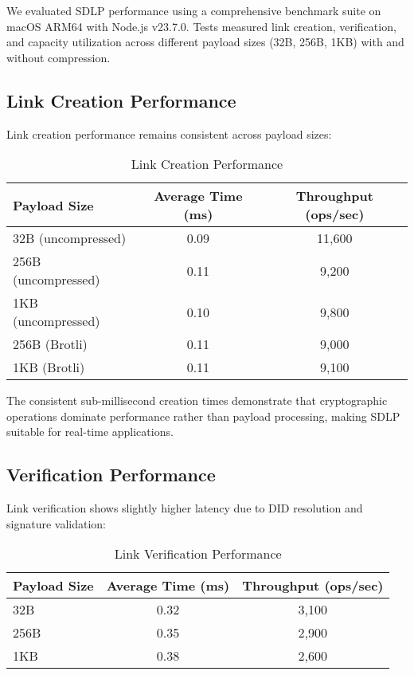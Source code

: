 \documentclass[conference]{IEEEtran}
\begin{document}
We evaluated SDLP performance using a comprehensive benchmark suite on macOS ARM64 with Node.js v23.7.0. Tests measured link creation, verification, and capacity utilization across different payload sizes (32B, 256B, 1KB) with and without compression.

\subsection{Link Creation Performance}

Link creation performance remains consistent across payload sizes:

\begin{table}[!t]
\caption{Link Creation Performance}
\label{tab:creation-performance}
\centering
\begin{tabular}{@{}lcc@{}}
\toprule
Payload Size & Average Time (ms) & Throughput (ops/sec) \\
\midrule
32B (uncompressed) & 0.09 & 11,600 \\
256B (uncompressed) & 0.11 & 9,200 \\
1KB (uncompressed) & 0.10 & 9,800 \\
256B (Brotli) & 0.11 & 9,000 \\
1KB (Brotli) & 0.11 & 9,100 \\
\bottomrule
\end{tabular}
\end{table}

The consistent sub-millisecond creation times demonstrate that cryptographic operations dominate performance rather than payload processing, making SDLP suitable for real-time applications.

\subsection{Verification Performance}

Link verification shows slightly higher latency due to DID resolution and signature validation:

\begin{table}[!t]
\caption{Link Verification Performance}
\label{tab:verification-performance}
\centering
\begin{tabular}{@{}lcc@{}}
\toprule
Payload Size & Average Time (ms) & Throughput (ops/sec) \\
\midrule
32B & 0.32 & 3,100 \\
256B & 0.35 & 2,900 \\
1KB & 0.38 & 2,600 \\
\bottomrule
\end{tabular}
\end{table}
\end{document}
